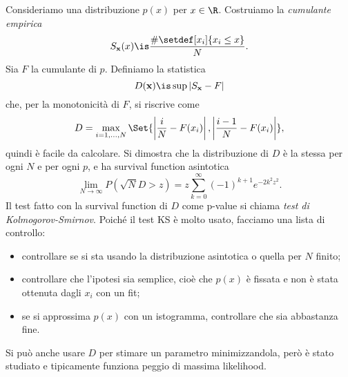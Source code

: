 
Consideriamo una distribuzione $p(x)$ per $x\in\R$.
Costruiamo la \emph{cumulante empirica} 
\begin{equation*}
	S_{\mathbf x}(x)
	\is \frac {\#\setdef[x_i]{x_i\le x}} N.
\end{equation*}
Sia $F$ la cumulante di $p$.
Definiamo la statistica
\begin{equation*}
	D(\mathbf x)
	\is \sup|S_\mathbf x-F|
\end{equation*}
che, per la monotonicità di $F$, si riscrive come
\begin{equation*}
	D = \max_{i=1,\dotsc,N} \Set{\left|\frac iN-F(x_i)\right|, \left|\frac{i-1}N-F(x_i)\right|},
\end{equation*}
quindi è facile da calcolare.
Si dimostra che la distribuzione di $D$ è la stessa per ogni $N$ e per ogni $p$,
e ha survival function asintotica
\begin{equation*}
	\lim_{N\to\infty} P(\sqrt N D>z)
	= z \sum_{k=0}^\infty (-1)^{k+1} e^{-2k^2z^2}.
\end{equation*}
Il test fatto con la survival function di $D$ come p-value si chiama \emph{test di Kolmogorov-Smirnov}.
Poiché il test KS è molto usato,
facciamo una lista di controllo:
\begin{itemize}
	\item controllare se si sta usando la distribuzione asintotica o quella per $N$ finito;
	\item controllare che l'ipotesi sia semplice,
	cioè che $p(x)$ è fissata e non è stata ottenuta dagli $x_i$ con un fit;
	\item se si approssima $p(x)$ con un istogramma, controllare che sia abbastanza fine.
\end{itemize}
Si può anche usare $D$ per stimare un parametro minimizzandola,
però è stato studiato e tipicamente funziona peggio di massima likelihood.
